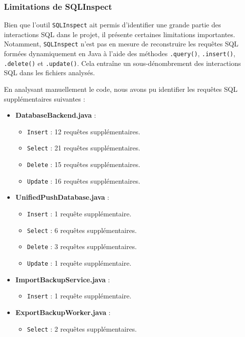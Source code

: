 \documentclass[a4paper,11pt]{article}
\begin{document}
\subsubsection*{Limitations de SQLInspect}

Bien que l'outil \texttt{SQLInspect} ait permis d'identifier une grande partie des interactions SQL dans le projet, il présente certaines limitations importantes. Notamment, \texttt{SQLInspect} n'est pas en mesure de reconstruire les requêtes SQL formées dynamiquement en Java à l'aide des méthodes \texttt{.query()}, \texttt{.insert()}, \texttt{.delete()} et \texttt{.update()}. Cela entraîne un sous-dénombrement des interactions SQL dans les fichiers analysés.

En analysant manuellement le code, nous avons pu identifier les requêtes SQL supplémentaires suivantes :

\begin{itemize}
    \item \textbf{DatabaseBackend.java} :
    \begin{itemize}
        \item \texttt{Insert} : 12 requêtes supplémentaires.
        \item \texttt{Select} : 21 requêtes supplémentaires.
        \item \texttt{Delete} : 15 requêtes supplémentaires.
        \item \texttt{Update} : 16 requêtes supplémentaires.
    \end{itemize}
    \item \textbf{UnifiedPushDatabase.java} :
    \begin{itemize}
        \item \texttt{Insert} : 1 requête supplémentaire.
        \item \texttt{Select} : 6 requêtes supplémentaires.
        \item \texttt{Delete} : 3 requêtes supplémentaires.
        \item \texttt{Update} : 1 requête supplémentaire.
    \end{itemize}
    \item \textbf{ImportBackupService.java} :
    \begin{itemize}
        \item \texttt{Insert} : 1 requête supplémentaire.
    \end{itemize}
    \item \textbf{ExportBackupWorker.java} :
    \begin{itemize}
        \item \texttt{Select} : 2 requêtes supplémentaires.
    \end{itemize}
\end{itemize}
\end{document}
